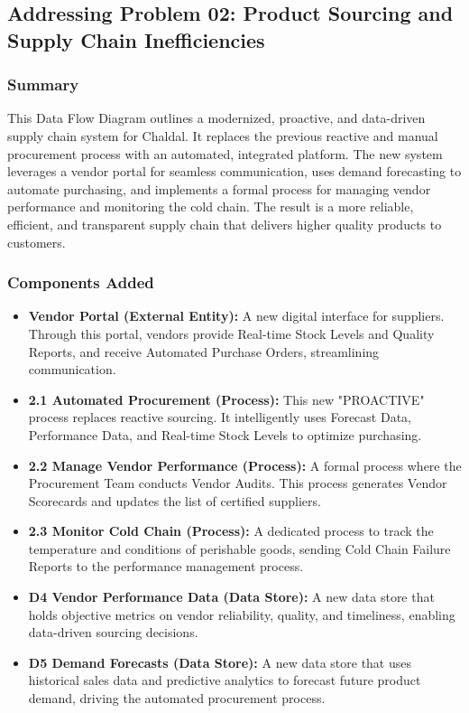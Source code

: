 \documentclass[12pt,a4paper]{article}
\begin{document}
\subsection{Addressing Problem 02: Product Sourcing and Supply Chain Inefficiencies}

\subsubsection{Summary}

This Data Flow Diagram outlines a modernized, proactive, and data-driven supply chain system for Chaldal. It replaces the previous reactive and manual procurement process with an automated, integrated platform. The new system leverages a vendor portal for seamless communication, uses demand forecasting to automate purchasing, and implements a formal process for managing vendor performance and monitoring the cold chain. The result is a more reliable, efficient, and transparent supply chain that delivers higher quality products to customers.

\subsubsection{Components Added}
\begin{tcolorbox}[colback=green!5!white,colframe=green!75!black,title=New Components]
\begin{itemize}
    \item \textbf{Vendor Portal (External Entity):} A new digital interface for suppliers. Through this portal, vendors provide Real-time Stock Levels and Quality Reports, and receive Automated Purchase Orders, streamlining communication.
    \item \textbf{2.1 Automated Procurement (Process):} This new "PROACTIVE" process replaces reactive sourcing. It intelligently uses Forecast Data, Performance Data, and Real-time Stock Levels to optimize purchasing.
    \item \textbf{2.2 Manage Vendor Performance (Process):} A formal process where the Procurement Team conducts Vendor Audits. This process generates Vendor Scorecards and updates the list of certified suppliers.
    \item \textbf{2.3 Monitor Cold Chain (Process):} A dedicated process to track the temperature and conditions of perishable goods, sending Cold Chain Failure Reports to the performance management process.
    \item \textbf{D4 Vendor Performance Data (Data Store):} A new data store that holds objective metrics on vendor reliability, quality, and timeliness, enabling data-driven sourcing decisions.
    \item \textbf{D5 Demand Forecasts (Data Store):} A new data store that uses historical sales data and predictive analytics to forecast future product demand, driving the automated procurement process.
\end{itemize}
\end{tcolorbox}
\end{document}
